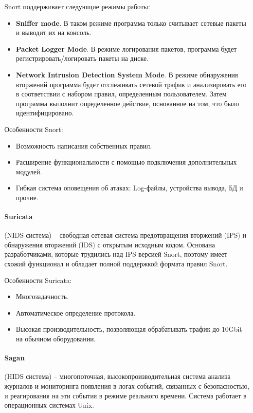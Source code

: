 Snort поддерживает следующие режимы работы:
\begin{itemize}
	\item \textbf{Sniffer mode}. В таком режиме программа только считывает сетевые пакеты и
	выводит их на консоль.

	\item \textbf{Packet Logger Mode}. В режиме логирования пакетов, программа будет
	регистрировать/логировать пакеты на диске.

	\item \textbf{Network Intrusion Detection System Mode}. В режиме обнаружения вторжений
	программа будет отслеживать сетевой трафик и анализировать его в соответствии с набором
	правил, определенным пользователем. Затем программа выполнит определенное действие,
	основанное на том, что было идентифицировано.
\end{itemize}

Особенности Snort:
\begin{itemize}
	\item Возможность написания собственных правил.
	\item Расширение функциональности с помощью подключения дополнительных модулей.
	\item Гибкая система оповещения об атаках: Log-файлы, устройства вывода, БД и прочие.
\end{itemize}


\paragraph*{Suricata} (NIDS система) -- свободная сетевая система предотвращения вторжений
(IPS) и обнаружения вторжений (IDS) с открытым исходным кодом. Основана разработчиками,
которые трудились над IPS версией Snort, поэтому имеет схожий функционал и обладает полной
поддержкой формата правил Snort.

Особенности Suricata:
\begin{itemize}
	\item Многозадачность.

	\item Автоматическое определение протокола.

	\item Высокая производительность, позволяющая обрабатывать трафик до 10Gbit на обычном
	оборудовании.
\end{itemize}


\paragraph*{Sagan} (HIDS система) -- многопоточная, высокопроизводительная система
анализа журналов и мониторинга появления в логах событий, связанных с безопасностью,
и реагирования на эти события в режиме реального времени. Система работает в операционных
системах Unix.


